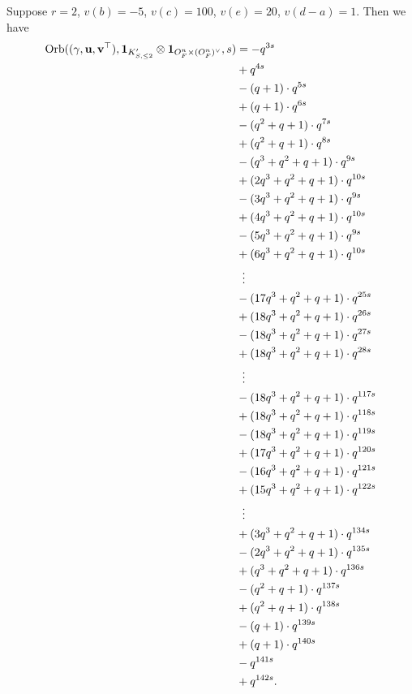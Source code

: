 \begin{example}
  Suppose $r = 2$, $v(b) = -5$, $v(c) = 100$, $v(e) = 20$, $v(d-a) = 1$.
  Then we have
  \begin{align*}
    \Orb(\guv, \mathbf{1}_{K'_{S, \le 2}} \otimes \oneV, s)
    &= -q^{3s} \\
    &+ q^{4s} \\
    &- (q+1) \cdot q^{5s} \\
    &+ (q+1) \cdot q^{6s} \\
    &- (q^2+q+1) \cdot q^{7s} \\
    &+ (q^2+q+1) \cdot q^{8s} \\
    &- (q^3+q^2+q+1) \cdot q^{9s} \\
    &+ (2q^3+q^2+q+1) \cdot q^{10s} \\
    &- (3q^3+q^2+q+1) \cdot q^{9s} \\
    &+ (4q^3+q^2+q+1) \cdot q^{10s} \\
    &- (5q^3+q^2+q+1) \cdot q^{9s} \\
    &+ (6q^3+q^2+q+1) \cdot q^{10s} \\
    &\vdotswithin= \\
    &- (17q^3+q^2+q+1) \cdot q^{25s} \\
    &+ (18q^3+q^2+q+1) \cdot q^{26s} \\
    &- (18q^3+q^2+q+1) \cdot q^{27s} \\
    &+ (18q^3+q^2+q+1) \cdot q^{28s} \\
    &\vdotswithin= \\
    &- (18q^3+q^2+q+1) \cdot q^{117s} \\
    &+ (18q^3+q^2+q+1) \cdot q^{118s} \\
    &- (18q^3+q^2+q+1) \cdot q^{119s} \\
    &+ (17q^3+q^2+q+1) \cdot q^{120s} \\
    &- (16q^3+q^2+q+1) \cdot q^{121s} \\
    &+ (15q^3+q^2+q+1) \cdot q^{122s} \\
    &\vdotswithin= \\
    &+ (3q^3+q^2+q+1) \cdot q^{134s} \\
    &- (2q^3+q^2+q+1) \cdot q^{135s} \\
    &+ (q^3+q^2+q+1) \cdot q^{136s} \\
    &- (q^2+q+1) \cdot q^{137s} \\
    &+ (q^2+q+1) \cdot q^{138s} \\
    &- (q+1) \cdot q^{139s} \\
    &+ (q+1) \cdot q^{140s} \\
    &- q^{141s} \\
    &+ q^{142s}.
  \end{align*}
\end{example}
